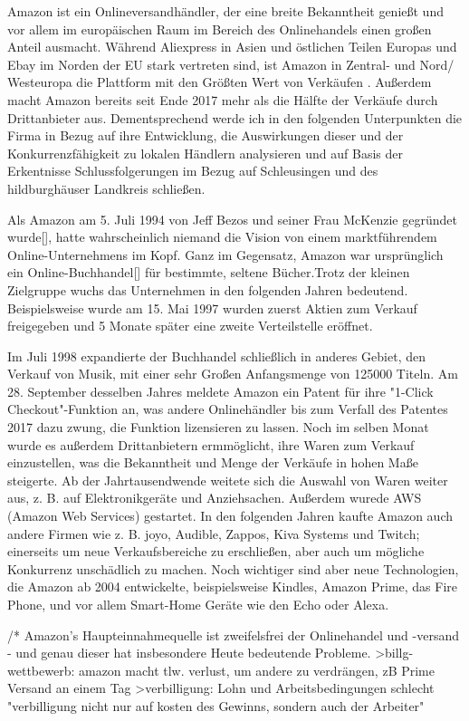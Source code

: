 Amazon ist ein Onlineversandhändler, der eine breite Bekanntheit genießt und vor allem im europäischen Raum im Bereich des Onlinehandels einen großen Anteil ausmacht. Während Aliexpress in Asien und östlichen Teilen Europas und Ebay im Norden der EU stark vertreten sind, ist Amazon in Zentral- und Nord/ Westeuropa die Plattform mit den Größten Wert von Verkäufen \cite[S. 22]{EuroCommerce}. Außerdem macht Amazon bereits seit Ende 2017 mehr als die Hälfte der Verkäufe durch Drittanbieter aus\cite[S. 25]{Haendlerbund}. Dementsprechend werde ich in den folgenden Unterpunkten die Firma in Bezug auf ihre Entwicklung, die Auswirkungen dieser und der Konkurrenzfähigkeit zu lokalen Händlern analysieren und auf Basis der Erkentnisse Schlussfolgerungen im Bezug auf Schleusingen und des hildburghäuser Landkreis schließen.

Als Amazon am 5. Juli 1994 von Jeff Bezos und seiner Frau McKenzie gegründet wurde[], hatte wahrscheinlich niemand die Vision von einem marktführendem Online-Unternehmens im Kopf. Ganz im Gegensatz, Amazon war ursprünglich ein Online-Buchhandel[] für bestimmte, seltene Bücher.Trotz der kleinen Zielgruppe wuchs das Unternehmen in den folgenden Jahren bedeutend. Beispielsweise wurde am 15. Mai 1997 wurden zuerst Aktien zum Verkauf freigegeben und 5 Monate später eine zweite Verteilstelle eröffnet.

Im Juli 1998 expandierte der Buchhandel schließlich in anderes Gebiet, den Verkauf von Musik, mit einer sehr Großen Anfangsmenge von 125000 Titeln. 
Am 28. September desselben Jahres meldete Amazon ein Patent für ihre "1-Click Checkout"-Funktion an, was andere Onlinehändler bis zum Verfall des Patentes 2017 dazu zwung, die Funktion lizensieren zu lassen.
Noch im selben Monat wurde es außerdem Drittanbietern ermmöglicht, ihre Waren zum Verkauf einzustellen, was die Bekanntheit und Menge der Verkäufe in hohen Maße steigerte.
Ab der Jahrtausendwende weitete sich die Auswahl von Waren weiter aus, z. B. auf Elektronikgeräte und Anziehsachen. Außerdem wurede AWS (Amazon Web Services) gestartet.
In den folgenden Jahren kaufte Amazon auch andere Firmen wie z. B. joyo, Audible, Zappos, Kiva Systems und Twitch; einerseits um neue Verkaufsbereiche zu erschließen, aber auch um mögliche Konkurrenz unschädlich zu machen.
Noch wichtiger sind aber neue Technologien, die Amazon ab 2004 entwickelte, beispielsweise Kindles, Amazon Prime, das Fire Phone, und vor allem Smart-Home Geräte wie den Echo oder Alexa.

/*
Amazon's Haupteinnahmequelle ist zweifelsfrei der Onlinehandel und -versand - und genau dieser hat insbesondere Heute bedeutende Probleme. 
  >billg-wettbewerb: amazon macht tlw. verlust, um andere zu verdrängen, zB Prime Versand an einem Tag
  >verbilligung: Lohn und Arbeitsbedingungen schlecht "verbilligung nicht nur auf kosten des Gewinns, sondern auch der Arbeiter"



